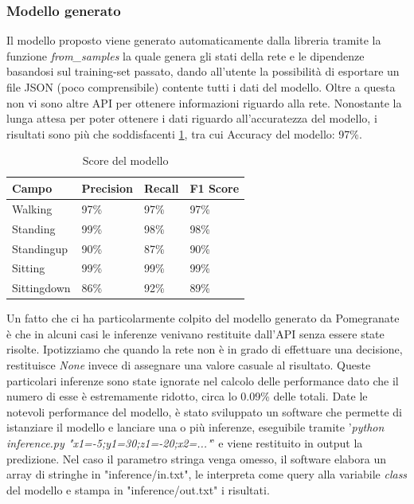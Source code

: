 \documentclass[12pt]{article}
\begin{document}
\subsubsection{Modello generato}
Il modello proposto viene generato automaticamente dalla libreria tramite la funzione \emph{from\_samples} la quale genera gli stati della rete e le dipendenze basandosi sul training-set passato, dando all'utente la possibilità di esportare un file JSON (poco comprensibile) contente tutti i dati del modello. Oltre a questa non vi sono altre API per ottenere informazioni riguardo alla rete.\newline
Nonostante la lunga attesa per poter ottenere i dati riguardo all'accuratezza del modello, i risultati sono più che soddisfacenti \ref{tab:results}, tra cui Accuracy del modello: 97\%.\newline
\begin{table}[h]
	\caption{Score del modello}\label{tab:results}
	\begin{tabular}{|l|l|l|l|}
		\hline
		Campo & Precision & Recall & F1 Score\\
		\hline
		Walking & 97\% & 97\% & 97\% \\
		Standing & 99\% & 98\% & 98\% \\
		Standingup & 90\% & 87\% & 90\% \\
		Sitting & 99\% & 99\% & 99\% \\
		Sittingdown & 86\% & 92\% & 89\% \\
		\hline
	\end{tabular}
\end{table}
Un fatto che ci ha particolarmente colpito del modello generato da Pomegranate è che in alcuni casi le inferenze venivano restituite dall'API senza essere state risolte. Ipotizziamo che quando la rete non è in grado di effettuare una decisione, restituisce \emph{None} invece di assegnare una valore casuale al risultato. Queste particolari inferenze sono state ignorate nel calcolo delle performance dato che il numero di esse è estremamente ridotto, circa lo 0.09\% delle totali. \newline
Date le notevoli performance del modello, è stato sviluppato un software che permette di istanziare il modello e lanciare una o più inferenze, eseguibile tramite '\emph{python inference.py "x1=-5;y1=30;z1=-20;x2=..."}' e viene restituito in output la predizione. Nel caso il parametro stringa venga omesso, il software elabora un array di stringhe in "inference/in.txt", le interpreta come query alla variabile \emph{class} del modello e stampa in "inference/out.txt" i risultati. 
\clearpage
\end{document}
